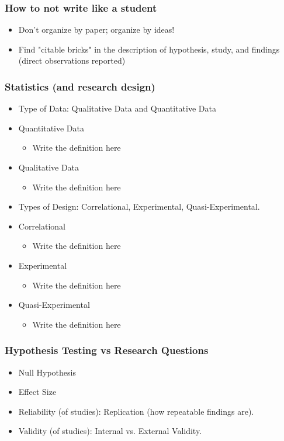 \documentclass{report}
\begin{document}
\subsubsection{How to not write like a student}
\begin{itemize}
    \item Don't organize by paper; organize by ideas! 
    \item Find "citable bricks" in the description of hypothesis, study, and findings (direct observations reported) 
\end{itemize}

\subsubsection{Statistics (and research design)}
\begin{itemize}
    \item Type of Data: Qualitative Data and Quantitative Data
    \item Quantitative Data 
    \begin{itemize}
        \item Write the definition here
    \end{itemize}
    \item Qualitative Data 
    \begin{itemize}
        \item Write the definition here
    \end{itemize}
    \item Types of Design: Correlational, Experimental, Quasi-Experimental. 
    \item Correlational
    \begin{itemize}
        \item Write the definition here
    \end{itemize}
    \item Experimental 
    \begin{itemize}
        \item Write the definition here
    \end{itemize}
    \item Quasi-Experimental 
    \begin{itemize}
        \item Write the definition here
    \end{itemize}
\end{itemize}

\subsubsection{Hypothesis Testing vs Research Questions}
\begin{itemize}
    \item Null Hypothesis
    \item Effect Size
    \item Reliability (of studies): Replication (how repeatable findings are). 
    \item Validity (of studies): Internal vs. External Validity.
\end{itemize}
\end{document}
